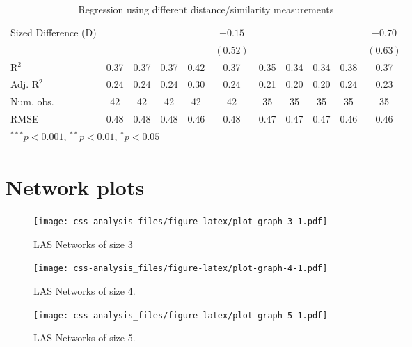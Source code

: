\documentclass[]{article}
\begin{document}
\begin{landscape}
\begin{table}
\begin{center}
\begin{tabular}{l c c c c c c c c c c }
\quad Sized Difference (D) &              &            &             &              & $-0.15$     &              &             &             &             & $-0.70$     \\
                           &              &            &             &              & $(0.52)$    &              &             &             &             & $(0.63)$    \\
\hline
R$^2$                      & 0.37         & 0.37       & 0.37        & 0.42         & 0.37        & 0.35         & 0.34        & 0.34        & 0.38        & 0.37        \\
Adj. R$^2$                 & 0.24         & 0.24       & 0.24        & 0.30         & 0.24        & 0.21         & 0.20        & 0.20        & 0.24        & 0.23        \\
Num. obs.                  & 42           & 42         & 42          & 42           & 42          & 35           & 35          & 35          & 35          & 35          \\
RMSE                       & 0.48         & 0.48       & 0.48        & 0.46         & 0.48        & 0.47         & 0.47        & 0.47        & 0.46        & 0.46        \\
\hline
\multicolumn{11}{l}{\scriptsize{$^{***}p<0.001$, $^{**}p<0.01$, $^*p<0.05$}}
\end{tabular}
\caption{Regression using different distance/similarity measurements}
\label{table:coefficients}
\end{center}
\end{table}

\end{landscape}

\clearpage

\normalsize

\hypertarget{network-plots}{%
\section{Network plots}\label{network-plots}}

\begin{figure}
\centering
\texttt{[image: css-analysis\_files/figure-latex/plot-graph-3-1.pdf]}
\caption{LAS Networks of size 3}
\end{figure}

\begin{figure}
\centering
\texttt{[image: css-analysis\_files/figure-latex/plot-graph-4-1.pdf]}
\caption{LAS Networks of size 4.}
\end{figure}

\begin{figure}
\centering
\texttt{[image: css-analysis\_files/figure-latex/plot-graph-5-1.pdf]}
\caption{LAS Networks of size 5.}
\end{figure}
\end{document}
